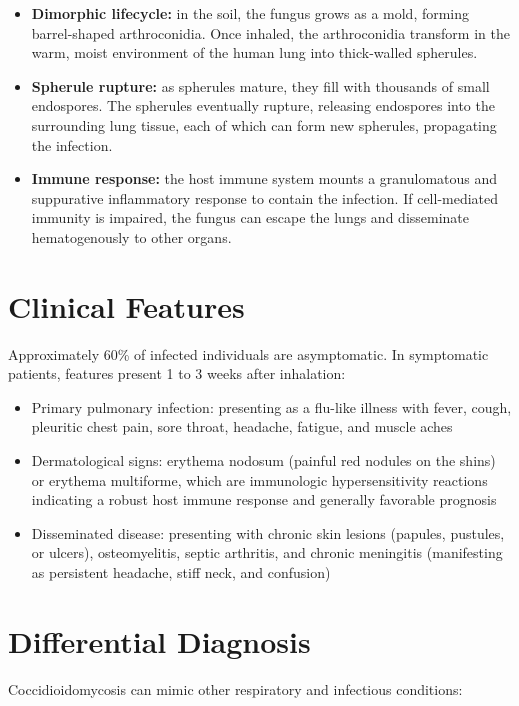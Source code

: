 \begin{itemize}
    \item \textbf{Dimorphic lifecycle:} in the soil, the fungus grows as a mold, forming barrel-shaped arthroconidia. Once inhaled, the arthroconidia transform in the warm, moist environment of the human lung into thick-walled spherules.
    \item \textbf{Spherule rupture:} as spherules mature, they fill with thousands of small endospores. The spherules eventually rupture, releasing endospores into the surrounding lung tissue, each of which can form new spherules, propagating the infection.
    \item \textbf{Immune response:} the host immune system mounts a granulomatous and suppurative inflammatory response to contain the infection. If cell-mediated immunity is impaired, the fungus can escape the lungs and disseminate hematogenously to other organs.
\end{itemize}

\section*{Clinical Features}
Approximately 60\% of infected individuals are asymptomatic. In symptomatic patients, features present 1 to 3 weeks after inhalation:

\begin{itemize}
    \item Primary pulmonary infection: presenting as a flu-like illness with fever, cough, pleuritic chest pain, sore throat, headache, fatigue, and muscle aches
    \item Dermatological signs: erythema nodosum (painful red nodules on the shins) or erythema multiforme, which are immunologic hypersensitivity reactions indicating a robust host immune response and generally favorable prognosis
    \item Disseminated disease: presenting with chronic skin lesions (papules, pustules, or ulcers), osteomyelitis, septic arthritis, and chronic meningitis (manifesting as persistent headache, stiff neck, and confusion)
\end{itemize}

\section*{Differential Diagnosis}
Coccidioidomycosis can mimic other respiratory and infectious conditions:

